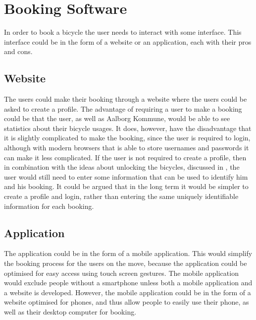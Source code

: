 \section{Booking Software}
In order to book a bicycle the user needs to interact with some interface.
This interface could be in the form of a website or an application, each with their pros and cons.

\subsection{Website}
The users could make their booking through a website where the users could be asked to create a profile.
The advantage of requiring a user to make a booking could be that the user, as well as Aalborg Kommune, would be able to see statistics about their bicycle usages.
It does, however, have the disadvantage that it is slightly complicated to make the booking, since the user is required to login, although with modern browsers that is able to store usernames and passwords it can make it less complicated.
If the user is not required to create a profile, then in combination with the ideas about unlocking the bicycles, discussed in , the user would still need to enter some information that can be used to identify him and his booking.
It could be argued that in the long term it would be simpler to create a profile and login, rather than entering the same uniquely identifiable information for each booking.

\subsection{Application}
The application could be in the form of a mobile application. 
This would simplify the booking process for the users on the move, because the application could be optimised for easy access using touch screen gestures.
The mobile application would exclude people without a smartphone unless both a mobile application and a website is developed.
However, the mobile application could be in the form of a website optimised for phones, and thus allow people to easily use their phone, as well as their desktop computer for booking. 

